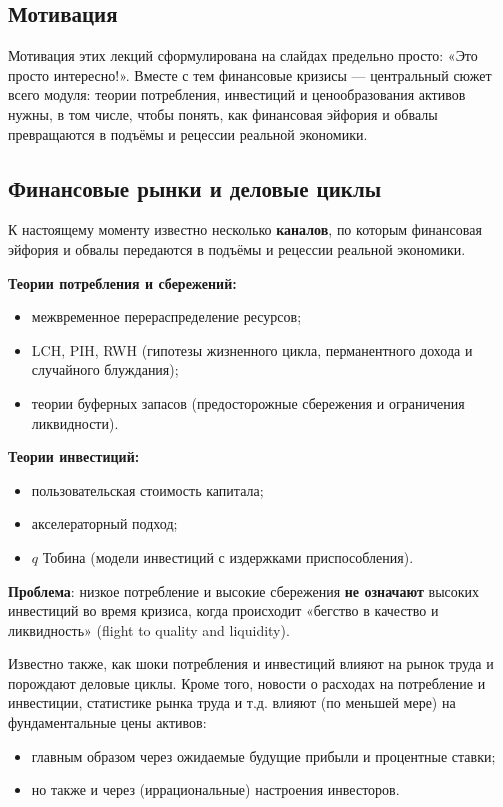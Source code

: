 \documentclass[10pt,a4paper]{article}
\begin{document}
\subsection{Мотивация}

Мотивация этих лекций сформулирована на слайдах предельно просто: «Это просто интересно!». Вместе с тем финансовые кризисы — центральный сюжет всего модуля: теории потребления, инвестиций и ценообразования активов нужны, в том числе, чтобы понять, как финансовая эйфория и обвалы превращаются в подъёмы и рецессии реальной экономики.

\subsection{Финансовые рынки и деловые циклы}

К настоящему моменту известно несколько \textbf{каналов}, по которым финансовая эйфория и обвалы передаются в подъёмы и рецессии реальной экономики.

\textbf{Теории потребления и сбережений:}
\begin{itemize}[leftmargin=1.3em]
\item межвременное перераспределение ресурсов;
\item LCH, PIH, RWH (гипотезы жизненного цикла, перманентного дохода и случайного блуждания);
\item теории буферных запасов (предосторожные сбережения и ограничения ликвидности).
\end{itemize}

\textbf{Теории инвестиций:}
\begin{itemize}[leftmargin=1.3em]
\item пользовательская стоимость капитала;
\item акселераторный подход;
\item $q$ Тобина (модели инвестиций с издержками приспособления).
\end{itemize}

\textbf{Проблема}: низкое потребление и высокие сбережения \textbf{не означают} высоких инвестиций во время кризиса, когда происходит «бегство в качество и ликвидность» (flight to quality and liquidity).

Известно также, как шоки потребления и инвестиций влияют на рынок труда и порождают деловые циклы. Кроме того, новости о расходах на потребление и инвестиции, статистике рынка труда и т.д. влияют (по меньшей мере) на фундаментальные цены активов:
\begin{itemize}[leftmargin=1.3em]
\item главным образом через ожидаемые будущие прибыли и процентные ставки;
\item но также и через (иррациональные) настроения инвесторов.
\end{itemize}
\end{document}
